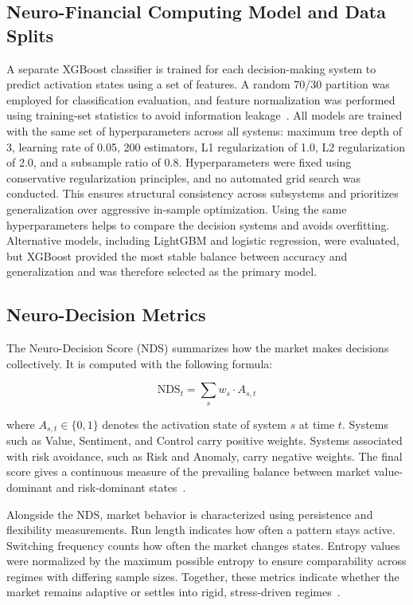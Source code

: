 \documentclass[runningheads,10pt]{llncs}
\begin{document}
\vspace{-15pt}
\subsection{Neuro-Financial Computing Model and Data Splits}
A separate XGBoost classifier is trained for each decision-making system to predict activation states using a set of features. A random 70/30 partition was employed for classification evaluation, and feature normalization was performed using training-set statistics to avoid information leakage~\cite{gu2020}. All models are trained with the same set of hyperparameters across all systems: maximum tree depth of 3, learning rate of 0.05, 200 estimators, L1 regularization of 1.0, L2 regularization of 2.0, and a subsample ratio of 0.8. Hyperparameters were fixed using conservative regularization principles, and no automated grid search was conducted. This ensures structural consistency across subsystems and prioritizes generalization over aggressive in-sample optimization. Using the same hyperparameters helps to compare the decision systems and avoids overfitting. Alternative models, including LightGBM and logistic regression, were evaluated, but XGBoost provided the most stable balance between accuracy and generalization and was therefore selected as the primary model.
\vspace{-15pt}
\subsection{Neuro-Decision Metrics}
\vspace{-10pt}
The Neuro-Decision Score (NDS) summarizes how the market makes decisions collectively. It is computed with the following formula:

\begin{equation}
\text{NDS}_t = \sum_{s} w_s \cdot A_{s,t}
\label{eq:nds}
\end{equation}

where $A_{s,t} \in \{0, 1\}$ denotes the activation state of system $s$ at time $t$. Systems such as Value, Sentiment, and Control carry positive weights. Systems associated with risk avoidance, such as Risk and Anomaly, carry negative weights. The final score gives a continuous measure of the prevailing balance between market value-dominant and risk-dominant states~\cite{glimcher2014,boorman2009}.

Alongside the NDS, market behavior is characterized using persistence and flexibility measurements. Run length indicates how often a pattern stays active. Switching frequency counts how often the market changes states. Entropy values were normalized by the maximum possible entropy to ensure comparability across regimes with differing sample sizes. Together, these metrics indicate whether the market remains adaptive or settles into rigid, stress-driven regimes~\cite{farmer2019}.
\end{document}
